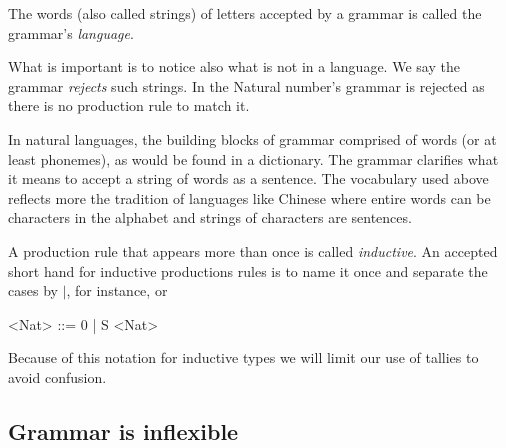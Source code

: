 \begin{definition}
    The words (also called strings) of letters accepted by a grammar is called the grammar's \emph{language}.
\end{definition}

What is important is to notice also what is not in a language.  We 
say the grammar \emph{rejects} such strings.  In the Natural 
number's grammar  is rejected as there is no production 
rule to match it.

\begin{remark}
    In natural languages, the building blocks of grammar 
    comprised of words (or at least phonemes), as would be found in a dictionary.  The grammar clarifies what it means to accept a string of 
    words as a sentence. The vocabulary used above reflects more the 
    tradition of languages like Chinese where entire words can be characters 
    in the alphabet and strings of characters are sentences.
\end{remark}

\begin{definition}
A production rule that appears more than once is called \emph{inductive}.
An accepted short hand for inductive productions rules is to name it once 
and separate the cases by $\mid$, for instance,
 or 
\begin{center}
\begin{gcode}[]
<Nat> ::= 0 
        | S <Nat>
\end{gcode}
\end{center}
\end{definition}


Because of this notation for inductive types we will limit our use of tallies
to avoid confusion.

    
\subsection{Grammar is inflexible}

